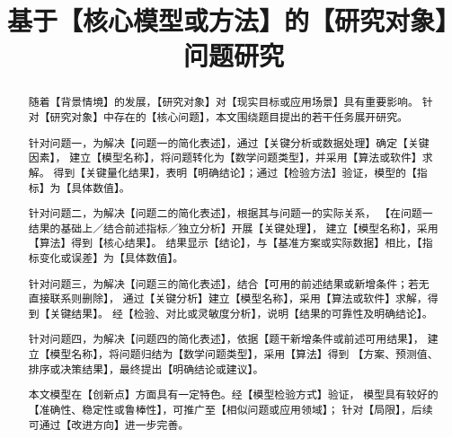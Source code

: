 \documentclass[withoutpreface,bwprint]{cumcmthesis}
\title{基于【核心模型或方法】的【研究对象】问题研究}
\renewcommand{\textbf}[1]{{\song\bfseries #1}}
\begin{document}
\maketitle

\begin{abstract}

	\noindent\textbf{摘要结构与内容要求：}

	随着【背景情境】的发展，【研究对象】对【现实目标或应用场景】具有重要影响。
	针对【研究对象】中存在的【核心问题】，本文围绕题目提出的若干任务展开研究。


	针对问题一，为解决【问题一的简化表述】，通过【关键分析或数据处理】确定【关键因素】，
	建立【模型名称】，将问题转化为【数学问题类型】，并采用【算法或软件】求解。
	得到【关键量化结果】，表明【明确结论】；通过【检验方法】验证，模型的【指标】为【具体数值】。

	针对问题二，为解决【问题二的简化表述】，根据其与问题一的实际关系，
	【在问题一结果的基础上／结合前述指标／独立分析】开展【关键处理】，
	建立【模型名称】，采用【算法】得到【核心结果】。
	结果显示【结论】，与【基准方案或实际数据】相比，【指标变化或误差】为【具体数值】。

	针对问题三，为解决【问题三的简化表述】，结合【可用的前述结果或新增条件；若无直接联系则删除】，
	通过【关键分析】建立【模型名称】，采用【算法或软件】求解，得到【关键结果】。
	经【检验、对比或灵敏度分析】，说明【结果的可靠性及明确结论】。

	针对问题四，为解决【问题四的简化表述】，依据【题干新增条件或前述可用结果】，
	建立【模型名称】，将问题归结为【数学问题类型】，采用【算法】得到
	【方案、预测值、排序或决策结果】，最终提出【明确结论或建议】。

	本文模型在【创新点】方面具有一定特色。经【模型检验方式】验证，
	模型具有较好的【准确性、稳定性或鲁棒性】，可推广至【相似问题或应用领域】；
	针对【局限】，后续可通过【改进方向】进一步完善。

	\vspace{0.5cm}

\end{abstract}
\end{document}
